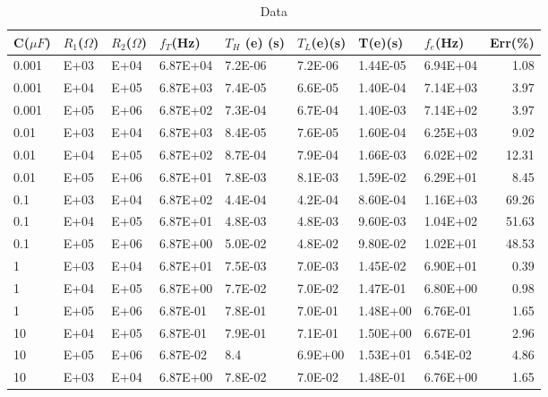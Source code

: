 \documentclass{scrartcl}
\newcommand{\1}{\mathbbm{1}}
\begin{document}
\begin{table}[H]
    \centering
    \begin{tabular}{|l|l|l|l|l|l|l|l|r|}
    \hline
        \textbf{\small C($\mu F$)} & \textbf{\small$R_1$($\Omega$)} & \textbf{\small$R_2$($\Omega$)} & \textbf{\small$f_T$(Hz)} & \textbf{$T_H$ (e) (s)} & \textbf{$T_L$(e)(s)} & \textbf{T(e)(s)} & \textbf{$f_{e}$(Hz)} & \textbf{Err(\%)} \\ \hline
        0.001 & \num{E+03} & \num{E+04} & \num{6.87E+04} & \num{7.2E-06} & \num{7.2E-06} & \num{1.44E-05} & \num{6.94E+04}  & \num{1.08 }\\ 
        0.001 & \num{E+04} & \num{E+05} & \num{6.87E+03} & \num{7.4E-05} & \num{6.6E-05} & \num{1.40E-04} & \num{7.14E+03}  & \num{3.97 }\\ 
        0.001 & \num{E+05} & \num{E+06} & \num{6.87E+02} & \num{7.3E-04} & \num{6.7E-04} & \num{1.40E-03} & \num{7.14E+02}  & \num{3.97 }\\ \hline
        0.01  & \num{E+03} & \num{E+04} & \num{6.87E+03} & \num{8.4E-05} & \num{7.6E-05} & \num{1.60E-04} & \num{6.25E+03}  & \num{9.02 }\\ 
        0.01  & \num{E+04} & \num{E+05} & \num{6.87E+02} & \num{8.7E-04} & \num{7.9E-04} & \num{1.66E-03} & \num{6.02E+02}  & \num{12.31} \\
        0.01  & \num{E+05} & \num{E+06} & \num{6.87E+01} & \num{7.8E-03} & \num{8.1E-03} & \num{1.59E-02} & \num{6.29E+01}  & \num{8.45 }\\ \hline
        0.1   & \num{E+03} & \num{E+04} & \num{6.87E+02} & \num{4.4E-04} & \num{4.2E-04} & \num{8.60E-04} & \num{1.16E+03}  & \num{69.26} \\
        0.1   & \num{E+04} & \num{E+05} & \num{6.87E+01} & \num{4.8E-03} & \num{4.8E-03} & \num{9.60E-03} & \num{1.04E+02}  & \num{51.63} \\ 
        0.1   & \num{E+05} & \num{E+06} & \num{6.87E+00} & \num{5.0E-02} & \num{4.8E-02} & \num{9.80E-02} & \num{1.02E+01}  & \num{48.53} \\\hline
        1     & \num{E+03} & \num{E+04} & \num{6.87E+01} & \num{7.5E-03} & \num{7.0E-03} & \num{1.45E-02} & \num{6.90E+01}  & \num{0.39 }\\ 
        1     & \num{E+04} & \num{E+05} & \num{6.87E+00} & \num{7.7E-02} & \num{7.0E-02} & \num{1.47E-01} & \num{6.80E+00}  & \num{0.98 }\\ 
        1     & \num{E+05} & \num{E+06} & \num{6.87E-01} & \num{7.8E-01} & \num{7.0E-01} & \num{1.48E+00} & \num{6.76E-01}  & \num{1.65 }\\ \hline
        10    & \num{E+04} & \num{E+05} & \num{6.87E-01} & \num{7.9E-01} & \num{7.1E-01} & \num{1.50E+00} & \num{6.67E-01}  & \num{2.96 }\\ 
        10    & \num{E+05} & \num{E+06} & \num{6.87E-02} & \num{8.4}     & \num{6.9E+00} & \num{1.53E+01} & \num{6.54E-02}  & \num{4.86 }\\ 
        10    & \num{E+03} & \num{E+04} & \num{6.87E+00} & \num{7.8E-02} & \num{7.0E-02} & \num{1.48E-01} & \num{6.76E+00}  & \num{1.65 }\\ \hline
    \end{tabular}
    \caption{Data}
\end{table}
\end{document}
